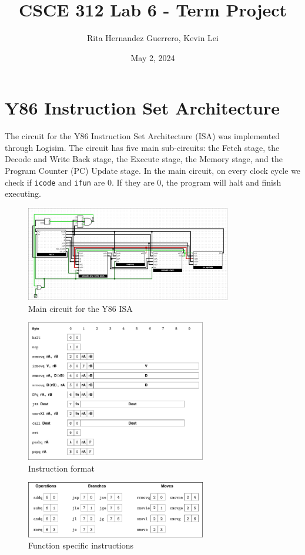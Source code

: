 \documentclass{article}
\title{CSCE 312 Lab 6 - Term Project}
\author{Rita Hernandez Guerrero, Kevin Lei}
\date{May 2, 2024}
\begin{document}
\maketitle

\section{Y86 Instruction Set Architecture}
The circuit for the Y86 Instruction Set Architecture (ISA) was implemented through Logisim. 
The circuit has five main sub-circuits: the Fetch stage, the Decode and Write Back stage, the Execute stage, the Memory stage, and the Program Counter (PC) Update stage. 
In the main circuit, on every clock cycle we check if \lstinline{icode} and \lstinline{ifun} are 0.
If they are 0, the program will halt and finish executing. 

\begin{figure}[H]
    \centering
    \includegraphics[width=0.8\textwidth]{./images/main_circuit.png}
    \caption{Main circuit for the Y86 ISA}
\end{figure}

\begin{figure}[H]
    \centering
    \includegraphics[width=0.7\textwidth]{./images/instructions.png}
    \caption{Instruction format}
\end{figure}
\newpage
\begin{figure}[H]
    \centering
    \includegraphics[width=0.7\textwidth]{./images/sub_instructions.png}
    \caption{Function specific instructions}
\end{figure}
\end{document}
